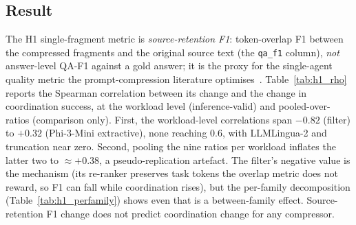 \subsection{Result}

The H1 single-fragment metric is \emph{source-retention F1}:
token-overlap F1 between the compressed fragments and the original
source text (the \texttt{qa\_f1} column), \emph{not} answer-level
QA-F1 against a gold answer; it is the proxy for the single-agent
quality metric the prompt-compression literature
optimises~\cite{jiang2024longllmlingua,pan2024llmlingua2}.
Table~\ref{tab:h1_rho} reports the Spearman correlation between its
change and the change in coordination success, at the workload level
(inference-valid) and pooled-over-ratios (comparison only). First, the workload-level correlations span
$-0.82$ (filter) to $+0.32$ (Phi-3-Mini extractive), none reaching
$0.6$, with LLMLingua-2 and truncation near zero. Second, pooling the
nine ratios per workload inflates the latter two to $\approx+0.38$, a
pseudo-replication artefact. The filter's negative value is the
mechanism (its re-ranker preserves task tokens the overlap metric
does not reward, so F1 can fall while coordination rises), but the
per-family decomposition (Table~\ref{tab:h1_perfamily}) shows even
that is a between-family effect. Source-retention F1 change does not predict coordination change for any compressor.

